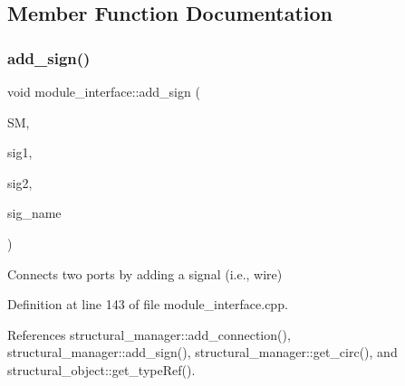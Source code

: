 \subsection{Member Function Documentation}
\mbox{\label{classmodule__interface_ad3a3d5baf94859db72af7365110fa702}} 
\subsubsection{\texorpdfstring{add\+\_\+sign()}{add\_sign()}}
{\footnotesize\ttfamily void module\+\_\+interface\+::add\+\_\+sign (\begin{DoxyParamCaption}\item[{const \hyperlink{structural__manager_8hpp_ab3136f0e785d8535f8d252a7b53db5b5}{structural\+\_\+manager\+Ref}}]{SM,  }\item[{const \hyperlink{structural__objects_8hpp_a8ea5f8cc50ab8f4c31e2751074ff60b2}{structural\+\_\+object\+Ref}}]{sig1,  }\item[{const \hyperlink{structural__objects_8hpp_a8ea5f8cc50ab8f4c31e2751074ff60b2}{structural\+\_\+object\+Ref}}]{sig2,  }\item[{const std\+::string \&}]{sig\+\_\+name }\end{DoxyParamCaption})\hspace{0.3cm}{\ttfamily [protected]}}



Connects two ports by adding a signal (i.\+e., wire) 



Definition at line 143 of file module\+\_\+interface.\+cpp.



References structural\+\_\+manager\+::add\+\_\+connection(), structural\+\_\+manager\+::add\+\_\+sign(), structural\+\_\+manager\+::get\+\_\+circ(), and structural\+\_\+object\+::get\+\_\+type\+Ref().

